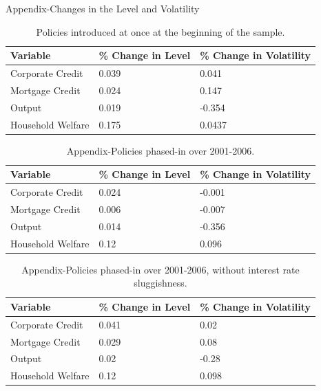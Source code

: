 \documentclass[8pt,aspectratio=169]{beamer}
\numberwithin{equation}{section}
\begin{document}
\begin{frame}{Appendix-Changes in the Level and Volatility}

\begin{table}[h]
\caption{Policies introduced at once at the beginning of the sample. }
\begin{tabular}{l|l|l}
Variable & \% Change in Level & \% Change in Volatility \\
\hline
\hline
    Corporate Credit           &       0.039    &      0.041 \\
    Mortgage Credit            &      0.024    &       0.147 \\
    Output         &     0.019    &    -0.354 \\ 
    Household Welfare       &     0.175     &     0.0437\\
\end{tabular}
\end{table}

\pause

\begin{table}[h]
\caption{Appendix-Policies phased-in over 2001-2006.}
\begin{tabular}{l|l|l}
\small
Variable & \% Change in Level & \% Change in Volatility \\
\hline
\hline
    Corporate Credit           &       0.024    &      -0.001 \\
    Mortgage Credit            &      0.006    &       -0.007 \\
    Output                      &     0.014    &    -0.356 \\ 
    Household Welfare       &     0.12     &     0.096\\
\end{tabular}
\end{table}

\pause


\begin{table}[h]
\caption{Appendix-Policies phased-in over 2001-2006, without interest rate sluggishness.}
\begin{tabular}{l|l|l}
\small
Variable & \% Change in Level & \% Change in Volatility \\
\hline
\hline
    Corporate Credit           &       0.041    &     0.02 \\
    Mortgage Credit            &      0.029    &      0.08 \\
    Output                      &     0.02    &    -0.28 \\ 
    Household Welfare       &     0.12     &     0.098\\
\end{tabular}
\end{table}



\end{frame}
\end{document}
